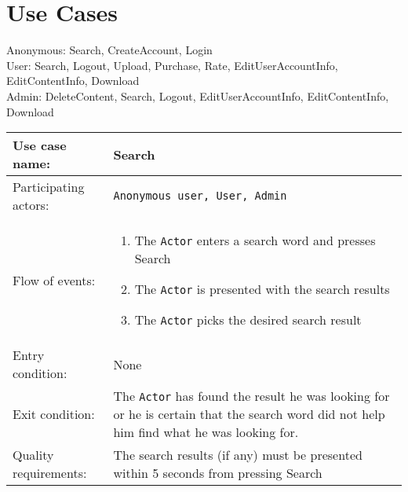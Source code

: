 \documentclass{article}
\begin{document}
\section{Use Cases}
Anonymous: Search, CreateAccount, Login \\
User: Search, Logout, Upload, Purchase, Rate, EditUserAccountInfo, EditContentInfo, Download \\
Admin: DeleteContent, Search, Logout, EditUserAccountInfo, EditContentInfo, Download \\

\noindent
\begin{tabular}{| l | p{8cm} |}
  \hline                        
 Use case name:  & Search   \\   \hline                
 Participating actors:  & \texttt{Anonymous user, User, Admin} \\   \hline %
  Flow of events: & \begin{enumerate}
\item{The \texttt{Actor} enters a search word and presses Search}
\item{The \texttt{Actor} is presented with the search results}
\item{The \texttt{Actor} picks the desired search result}
\end{enumerate}
 \\   \hline 
Entry condition: & None \\ \hline
Exit condition: & The \texttt{Actor} has found the result he was looking for or he is certain that the search word did not help him find what he was looking for. \\ \hline
Quality requirements: & The search results (if any) must be presented within 5 seconds from pressing Search \\ \hline             
\end{tabular}
\end{document}
